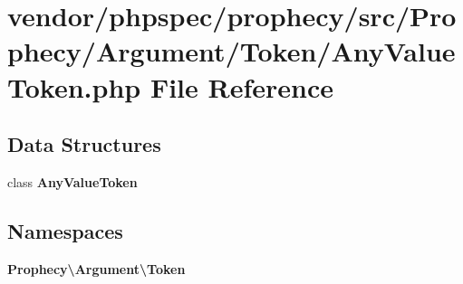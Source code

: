 \section{vendor/phpspec/prophecy/src/\+Prophecy/\+Argument/\+Token/\+Any\+Value\+Token.php File Reference}
\label{_any_value_token_8php}
\subsection*{Data Structures}
\begin{DoxyCompactItemize}
\item 
class {\bf Any\+Value\+Token}
\end{DoxyCompactItemize}
\subsection*{Namespaces}
\begin{DoxyCompactItemize}
\item 
 {\bf Prophecy\textbackslash{}\+Argument\textbackslash{}\+Token}
\end{DoxyCompactItemize}
